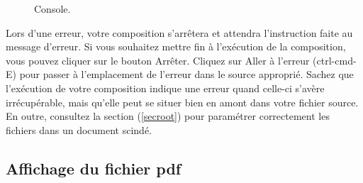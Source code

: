 \documentclass[11pt,french]{article}
\newcommand{\acr}[1]{\textsf{#1}}
\newcommand{\cmd}[1]{\textsf{#1}}
\begin{document}
\begin{figure}
\centering
{}
\caption{Console.\label{ConsoleWindow}}
\end{figure}


Lors d'une erreur, votre composition s'arrêtera et attendra l'instruction faite au message d'erreur. Si vous souhaitez mettre fin à l'exécution de la composition, vous pouvez cliquer sur le bouton \cmd{Arrêter}. Cliquez sur \cmd{Aller à l'erreur} (\cmd{ctrl-cmd-E}) pour passer à l'emplacement de l'erreur dans le source approprié. Sachez que l'exécution de votre composition indique une erreur quand celle-ci s'avère irrécupérable, mais qu'elle peut se situer bien en amont dans votre fichier source. En outre, consultez la section (\ref{secroot}) pour paramétrer correctement les fichiers dans un document scindé. 

\subsection{Affichage du fichier \acr{pdf}}
\end{document}
